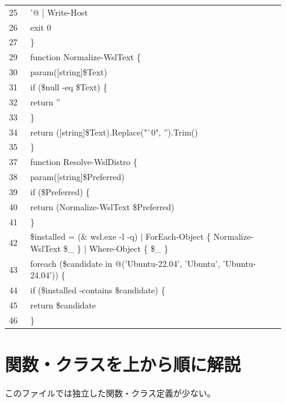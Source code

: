 \documentclass[a4paper,11pt]{article}
\begin{document}
\begin{longtable}{p{0.07\linewidth} p{0.84\linewidth}}
25 & '@ | Write-Host \\
26 & exit 0 \\
27 & \} \\
29 & function Normalize-WslText \{ \\
30 & param([string]\$Text) \\
31 & if (\$null -eq \$Text) \{ \\
32 & return '' \\
33 & \} \\
34 & return ([string]\$Text).Replace("`0", '').Trim() \\
35 & \} \\
37 & function Resolve-WslDistro \{ \\
38 & param([string]\$Preferred) \\
39 & if (\$Preferred) \{ \\
40 & return (Normalize-WslText \$Preferred) \\
41 & \} \\
42 & \$installed = (\& wsl.exe -l -q) | ForEach-Object \{ Normalize-WslText \$\_ \} | Where-Object \{ \$\_ \} \\
43 & foreach (\$candidate in @('Ubuntu-22.04', 'Ubuntu', 'Ubuntu-24.04')) \{ \\
44 & if (\$installed -contains \$candidate) \{ \\
45 & return \$candidate \\
46 & \} \\
            \bottomrule
            \end{longtable}



        \section*{関数・クラスを上から順に解説}
        このファイルでは独立した関数・クラス定義が少ない。
\end{document}
